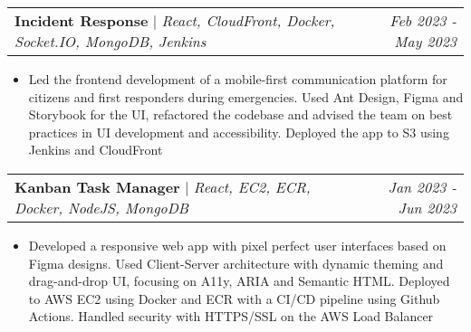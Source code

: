 \documentclass[letterpaper]{article}
\makeatletter
\newcommand{\resumeItemWithoutTitle}[1]{
  \item\small{
    {#1 \vspace{-2pt}}
  }
}
\newcommand{\projectHeading}[3]{
  \begin{tabular*}{\textwidth}{l@{\extracolsep{\fill}}r}
        \textbf{#1} 
        \hspace{-2pt} $\vert$ \hspace{-2pt} \small{\textit{#2}} 
        & 
        \textit{#3} \\
    \end{tabular*}\vspace{-2pt}
}
\newcommand{\projectHeadingWithLink}[4]{
  \begin{tabular*}{\textwidth}{l@{\extracolsep{\fill}}r}
        \textbf{\href{#4}{\color{blue}{#1}}}
        \hspace{-2pt} $\vert$ \hspace{-2pt} \small{\textit{#2}} 
        & 
        \textit{#3} \\
    \end{tabular*}\vspace{-2pt}
}
\newcommand{\resumeItemListStart}{\begin{itemize}}
\newcommand{\resumeItemListEnd}{\end{itemize}}
\makeatother
\begin{document}




\vspace{3pt}
\projectHeading {Incident Response}{React, CloudFront, Docker, Socket.IO, MongoDB, Jenkins}{Feb 2023 - May 2023}
\resumeItemListStart

\resumeItemWithoutTitle{Led the frontend development of a mobile-first communication platform for citizens and first responders during emergencies. Used Ant Design, Figma and Storybook for the UI, refactored the codebase and advised the team on best practices in UI development and accessibility. Deployed the app to S3 using Jenkins and CloudFront}
\resumeItemListEnd




\vspace{3pt}
\projectHeading {Kanban Task Manager}{React, EC2, ECR, Docker, NodeJS, MongoDB}{Jan 2023 - Jun 2023}
\resumeItemListStart
\resumeItemWithoutTitle{Developed a responsive web app with pixel perfect user interfaces based on Figma designs. Used Client-Server architecture with dynamic theming and drag-and-drop UI, focusing on A11y, ARIA and Semantic HTML. Deployed to AWS EC2 using Docker and ECR with a CI/CD pipeline using Github Actions. Handled security with HTTPS/SSL on the AWS Load Balancer}
\resumeItemListEnd
\end{document}

